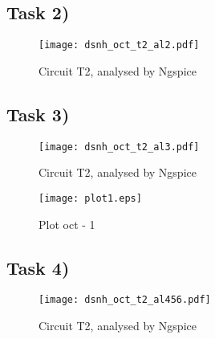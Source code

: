 \subsection{Task 2)}
\label{subsec:task2_a}

\begin{figure}[ht]
	\centering
	\texttt{[image: dsnh\_oct\_t2\_al2.pdf]}
	\caption{Circuit T2, analysed by Ngspice}
\label{fig:Dsnh_sim_t2}
\end{figure}

\subsection{Task 3)}
\label{subsec:task3_a}

\begin{figure}[ht]
	\centering
	\texttt{[image: dsnh\_oct\_t2\_al3.pdf]}
	\caption{Circuit T2, analysed by Ngspice}
\label{fig:Dsnh_sim_t2}
\end{figure}

\begin{figure}[ht]
	\centering
	\texttt{[image: plot1.eps]}
	\caption{Plot oct - 1}
\label{fig:Dsnh_sim_t2}
\end{figure}

\subsection{Task 4)}
\label{subsec:task4_a}

\begin{figure}[ht]
	\centering
	\texttt{[image: dsnh\_oct\_t2\_al456.pdf]}
	\caption{Circuit T2, analysed by Ngspice}
\label{fig:Dsnh_sim_t2}
\end{figure}


